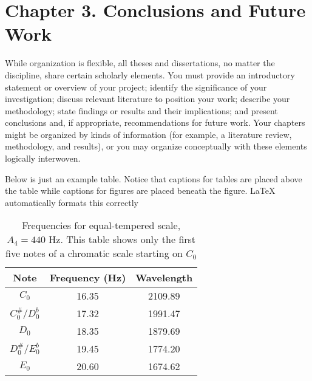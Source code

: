 \chapter{Chapter 3. Conclusions and Future Work}

While organization is flexible, all theses and dissertations, no matter the discipline, share certain scholarly elements. You must provide an introductory statement or overview of your project; identify the significance of your investigation; discuss relevant literature to position your work; describe your methodology; state findings or results and their implications; and present conclusions and, if appropriate, recommendations for future work. Your chapters might be organized by kinds of information (for example, a literature review, methodology, and results), or you may organize conceptually with these elements logically interwoven.

Below is just an example table. Notice that captions for tables are placed above the table while captions for figures are placed beneath the figure. LaTeX automatically formats this correctly
\begin{table}[h]

\caption[Frequencies for equal-tempered scale, $A_4=440$]{Frequencies for equal-tempered scale, $A_4=440$ Hz. This table shows only the first five notes of a chromatic scale starting on $C_0$} %

\begin{center}
\begin{tabular}{|c | c | c |} 
 \hline
\textbf{Note} & \textbf{Frequency (Hz)} & \textbf{Wavelength} \\ [0.5ex] 
 \hline
 $C_0$ & 16.35 & 2109.89 \\ 
 \hline
 $C^{\#}_0/D^b_0$ & 17.32 & 1991.47 \\
 \hline
 $D_0$ & 18.35 & 1879.69 \\
 \hline
 $D^{\#}_0/E^b_0$ & 19.45 & 1774.20 \\
 \hline
 $E_0$ & 20.60 & 1674.62 \\ [1ex] 
 \hline
\end{tabular}
\end{center}


\end{table}

